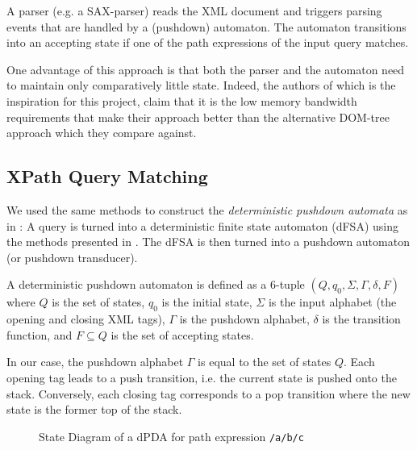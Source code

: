 A parser (e.g. a SAX-parser) reads the XML document and triggers parsing events
that are handled by a (pushdown) automaton. The automaton transitions
into an accepting state if one of the path expressions of the input query matches.

One advantage of this approach is that both the parser and the automaton need to
maintain only comparatively little state. Indeed, the authors of
\cite{Ogden2013} which is the inspiration for this project, claim that it is the
low memory bandwidth requirements that make their approach better than the
alternative DOM-tree approach which they compare against.

\subsection{XPath Query Matching}
We used the same methods to construct the \emph{deterministic pushdown automata}
as in \cite{Ogden2013}: A query is turned into a deterministic finite state
automaton (dFSA) using the methods presented in \cite{Green2014}. The dFSA is
then turned into a pushdown automaton (or pushdown transducer).

A deterministic pushdown automaton is defined as a 6-tuple $(Q, q_0, \Sigma,
\Gamma, \delta, F)$ where $Q$ is the set of states, $q_0$ is the initial state,
$\Sigma$ is the input alphabet (the opening and closing XML tags), $\Gamma$ is
the pushdown alphabet, $\delta$ is the transition function, and $F \subseteq Q$ is
the set of accepting states.

In our case, the pushdown alphabet $\Gamma$ is equal to the set of states $Q$.
Each opening tag leads to a push transition, i.e. the current state is pushed
onto the stack. Conversely, each closing tag corresponds to a pop transition
where the new state is the former top of the stack.


\begin{figure}
\centering
{}
\caption{State Diagram of a dPDA for path expression \texttt{/a/b/c}}
\label{fig:exampleFSA}
\end{figure}

